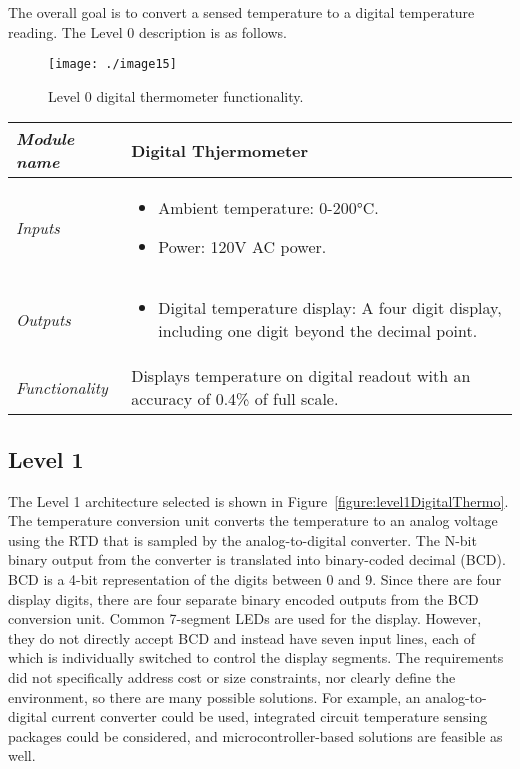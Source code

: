 The overall goal is to convert a sensed temperature to a digital
temperature reading. The Level 0 description is as follows.

\begin{figure}
\texttt{[image: ./image15]}
\caption{Level 0 digital thermometer functionality.}
\label{figure:conceptFan}
\end{figure}

\begin{table}
\begin{tabular}{|l|m{10cm}|}
\hline
\emph{Module name} & Digital Thjermometer \\ \hline
\emph{Inputs} & 
\begin{itemize}
\item Ambient temperature: 0-200°C.
\item Power: 120V AC power.
\end{itemize}  \\ \hline
\emph{Outputs} & 
\begin{itemize}
\item
  Digital temperature display: A four digit display, including one digit
  beyond the decimal point.
\end{itemize} \\ \hline
\emph{Functionality} & Displays temperature on digital readout with an
accuracy of 0.4\% of full scale. \\ \hline
\end{tabular}
\end{table}

\subsection*{Level 1}
\label{subsection:level-1-2}

The Level 1 architecture selected is shown in 
Figure~\ref{figure:level1DigitalThermo}. The
temperature conversion unit converts the temperature to an analog
voltage using the RTD that is sampled by the analog-to-digital
converter. The N-bit binary output from the converter is translated into
binary-coded decimal (BCD). BCD is a 4-bit representation of the digits
between 0 and 9. Since there are four display digits, there are four
separate binary encoded outputs from the BCD conversion unit. Common
7-segment LEDs are used for the display. However, they do not directly
accept BCD and instead have seven input lines, each of which is
individually switched to control the display segments. The requirements
did not specifically address cost or size constraints, nor clearly
define the environment, so there are many possible solutions. For
example, an analog-to-digital current converter could be used,
integrated circuit temperature sensing packages could be considered, and
microcontroller-based solutions are feasible as well.

